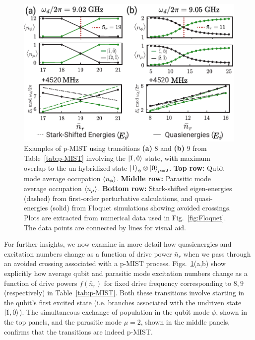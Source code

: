 \documentclass[%
reprint,
superscriptaddress,
 amsmath,amssymb,
 aps,
 prx,
longbibliography,
floatfix,
]{revtex4-2}
\begin{document}
 \begin{figure}[t]
    \centering
    \includegraphics[width=\linewidth]{Figures/Floquet_011.pdf}
    \caption{Examples of p-MIST using transitions \textbf{(a)} $8$ and \textbf{(b)} $9$ from Table~\ref{tab:p-MIST} involving the $\ket{\tilde{1},\tilde{0}}$ state, with maximum overlap to the un-hybridized state $\ket{1}_\phi\otimes\ket{0}_{\mu=2}$. \textbf{Top row:} Qubit mode average occupation $\braket{n_\phi}$. \textbf{Middle row:} Parasitic mode average occupation $\braket{n_\mu}$. \textbf{Bottom row:} Stark-shifted eigen-energies (dashed) from first-order perturbative calculations, and quasi-energies (solid) from Floquet simulations showing avoided crossings. Plots are extracted from numerical data used in Fig.~\ref{fig:Floquet}. The data points are connected by lines for visual aid.}
    \label{fig:011}
\end{figure}

For further insights, we now examine in more detail how quasienergies and excitation numbers change as a function of drive power $\bar{n}_r$ when we pass through an avoided crossing associated with a p-MIST process. Figs.~\ref{fig:011}(a,b) show explicitly how average qubit and parasitic mode excitation numbers change as a function of drive powers $f(\bar n_r)$ for fixed drive frequency corresponding to $8,9$ (respectively) in Table~\ref{tab:p-MIST}.  Both these transitions involve starting in the qubit's first excited state (i.e. branches associated with the undriven state $\ket{\tilde{1},\tilde{0}}$). The simultaneous exchange of population in the qubit mode $\phi$, shown in the top panels, and the parasitic mode $\mu=2$, shown in the middle panels, confirms that the transitions are indeed p-MIST. 
\end{document}
